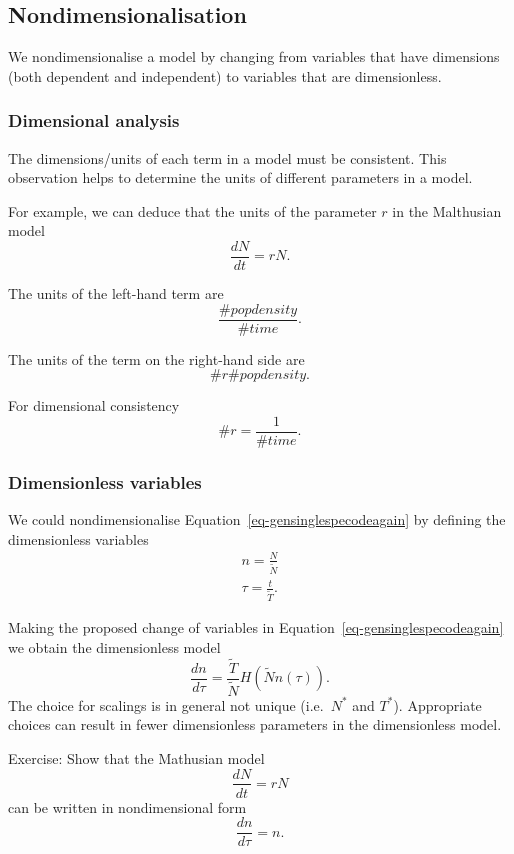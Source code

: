 \documentclass[
  letterpaper,
  DIV=11,
  numbers=noendperiod]{scrreprt}
\begin{document}
\hypertarget{nondimensionalisation}{%
\subsection{Nondimensionalisation}\label{nondimensionalisation}}

We nondimensionalise a model by changing from variables that have
dimensions (both dependent and independent) to variables that are
dimensionless.

\hypertarget{dimensional-analysis}{%
\subsubsection{Dimensional analysis}\label{dimensional-analysis}}

The dimensions/units of each term in a model must be consistent. This
observation helps to determine the units of different parameters in a
model.

For example, we can deduce that the units of the parameter \(r\) in the
Malthusian model \[
\frac{dN}{dt}=rN.
\]

The units of the left-hand term are \[
\frac{\# pop density}{\# time}.
\]

The units of the term on the right-hand side are \[
\#r\#popdensity.
\]

For dimensional consistency \[
\#r = \frac{1}{\#time}.
\]

\hypertarget{dimensionless-variables}{%
\subsubsection{Dimensionless variables}\label{dimensionless-variables}}

We could nondimensionalise Equation~\ref{eq-gensinglespecodeagain} by
defining the dimensionless variables \[
\begin{aligned}
n=\frac{N}{\tilde{N}} \nonumber \\
\tau=\frac{t}{\tilde{T}}.\nonumber
\end{aligned}
\]

Making the proposed change of variables in
Equation~\ref{eq-gensinglespecodeagain} we obtain the dimensionless
model \[
\frac{dn}{d\tau}= \frac{\tilde{T}}{\tilde{N}}H(\tilde{N}n(\tau)).
\] The choice for scalings is in general not unique (i.e.~\(N^*\) and
\(T^*\)). Appropriate choices can result in fewer dimensionless
parameters in the dimensionless model.

Exercise: Show that the Mathusian model \[
\frac{dN}{dt}=rN
\] can be written in nondimensional form \[
\frac{dn}{d\tau}=n.
\]
\end{document}
